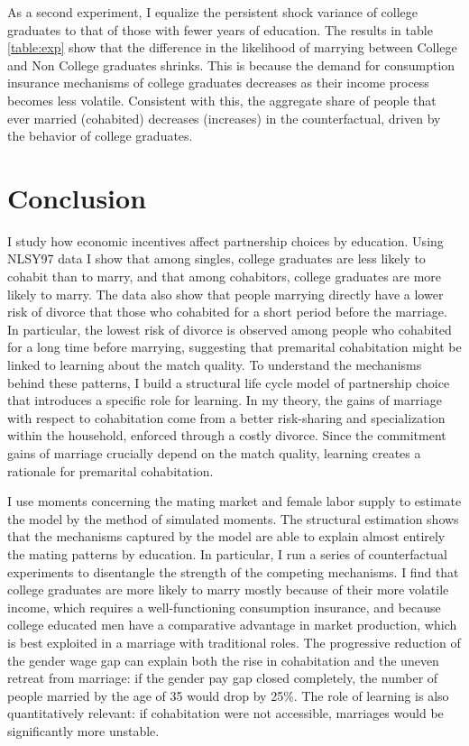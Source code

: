 \documentclass[12pt]{article}
\begin{document}
 As a second experiment, I equalize the persistent shock variance of college graduates to that of those with fewer years of education. The results in table \ref{table:exp} show that the difference in the likelihood of marrying between College and Non College graduates shrinks. This is because the demand for consumption insurance mechanisms of college graduates decreases as their income process becomes less volatile. Consistent with this, the aggregate share of people that ever married (cohabited) decreases (increases) in the counterfactual, driven by the behavior of college graduates.
\section{Conclusion}
I study how economic incentives affect partnership choices by education. Using NLSY97 data I show that among singles, college graduates are less likely to cohabit than to marry, and that among cohabitors, college graduates are more likely to marry. The data also show that people marrying directly have a lower risk of divorce that those who cohabited for a short period before the marriage. In particular, the lowest risk of divorce is observed among people who cohabited for a long time before marrying, suggesting that premarital cohabitation might be linked to learning about the match quality. To understand the mechanisms behind these patterns, I build a structural life cycle model of partnership choice that introduces a specific role for learning. In my theory, the gains of marriage with respect to cohabitation come from a better risk-sharing and specialization within the household, enforced through a costly divorce. Since the commitment gains of marriage crucially depend on the match quality, learning creates a rationale for premarital cohabitation. 

I use moments concerning the mating market and female labor supply to estimate the model by the method of simulated moments. The structural estimation shows that the mechanisms captured by the model are able to explain almost entirely the mating patterns by education. In particular, I run a series of counterfactual experiments to disentangle the strength of the competing mechanisms. I find that college graduates are more likely to marry mostly because of their more volatile income, which requires a well-functioning consumption insurance, and because college educated men have a comparative advantage in market production, which is best exploited in a marriage with traditional roles. The progressive reduction of the gender wage gap can explain both the rise in cohabitation and the uneven retreat from marriage: if the gender pay gap closed completely, the number of people married by the age of 35 would drop by 25\%. The role of learning is also quantitatively relevant: if cohabitation were not accessible, marriages would be significantly more unstable.
\end{document}
